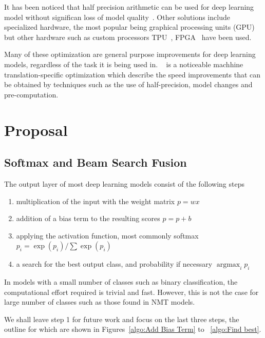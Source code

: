 \documentclass[11pt,a4paper]{article}
\DeclareMathOperator*{\argmax}{argmax}
\begin{document}
It has been noticed that half precision arithmetic can be used for deep learning model without significan loss of model quality~\citep{DBLP:journals/corr/abs-1710-03740}. Other solutions include specialized hardware, the most popular being graphical processing units (GPU) but other hardware such as custom processors TPU~\citep{DBLP:journals/corr/JouppiYPPABBBBB17}, FPGA~\citep{DBLP:journals/corr/LaceyTA16} have been used. 

Many of these optimization are general purpose improvements for deep learning models, regardless of the task it is being used in. ~\cite{DBLP:conf/emnlp/Devlin17} is a noticeable machhine translation-specific optimization which describe the speed improvements that can be obtained by techniques such as the use of half-precision, model changes and pre-computation.

\section{Proposal}
\label{sec:Proposal}

\subsection{Softmax and Beam Search Fusion}

The output layer of most deep learning models consist of the following steps
\begin{enumerate}
   \item \vspace{-2 mm} multiplication of the input with the weight matrix $p = w x$
   \item \vspace{-2 mm} addition of a bias term to the resulting scores $p = p + b$
   \item \vspace{-2 mm} applying the activation function, most commonly softmax $ p_i = \exp(p_i) / \sum \exp(p_i) $
   \item \vspace{-2 mm} a search for the best output class, and probability if necessary $\argmax_i p_i$
\end{enumerate}

In models with a small number of classes such as binary classification, the computational effort required is trivial and fast. However, this is not the case for large number of classes such as those found in NMT models.

We shall leave step 1 for future work and focus on the last three steps, the outline for which are shown in Figures~\ref{algo:Add Bias Term} to ~\ref{algo:Find best}.
\end{document}
